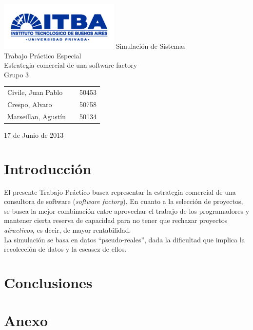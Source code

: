 \documentclass[a4paper,10pt]{article}
\begin{document}
\setcounter{secnumdepth}{5}
\setcounter{tocdepth}{5}

\begin{titlepage}
        \vfill
        \thispagestyle{empty}
        \begin{center}
                \includegraphics{./images/itba_logo.png}
                \vfill
                \Huge{Simulación de Sistemas}\\
                \vspace{1cm}
                \Huge{Trabajo Pr\'actico Especial}\\
                \vspace{1cm}
                \Huge{Estrategia comercial de una software factory}\\
                \vspace{1cm}
                Grupo 3
        \end{center}
        \vfill
        \large{
        \begin{tabular}{lcr}
                Civile, Juan Pablo && 50453\\
                Crespo, Alvaro && 50758 \\
                Marseillan, Agustín && 50134\\
        \end{tabular}
}
        \vspace{2cm}
        \begin{center}
                \large{17 de Junio de 2013}\\
        \end{center}
\end{titlepage}
\newpage

\setcounter{page}{1}

\section{Introducción}

El presente Trabajo Práctico busca representar la estrategia comercial de una consultora de software (\textit{software factory}). En cuanto a la selección de proyectos, se busca 
la mejor combinación entre aprovechar el trabajo de los programadores y mantener cierta reserva de capacidad para no tener que rechazar proyectos \textit{atractivos}, es decir,
de mayor rentabilidad.\\

La simulación se basa en datos ``pseudo-reales'', dada la dificultad que implica la recolección de datos y la escasez de ellos.\\







\section{Conclusiones}


\clearpage
\appendix
\section{Anexo}
\end{document}
